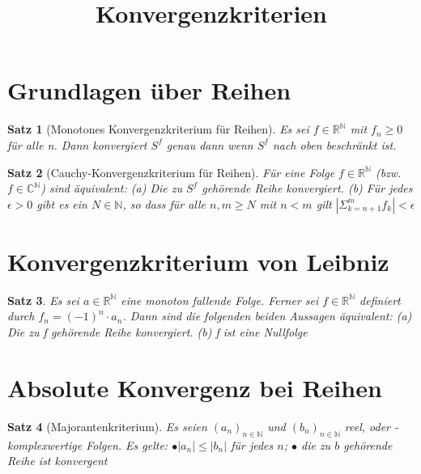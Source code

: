 \usepackage[utf8]{inputenc}
\usepackage{amssymb}
\usepackage{mathtools}
 
\title{Konvergenzkriterien}
\newtheorem{theorem}{Satz}[section]



\section{Grundlagen über Reihen}
\begin{theorem}[Monotones Konvergenzkriterium für Reihen]	

Es sei $f \in \mathbb{R}^{\mathbb{N}}$ mit $f_{n} \geq 0$ für alle n. Dann konvergiert $S^{f}$ genau dann wenn $S^{f}$ nach oben beschränkt ist.

\end{theorem}

\begin{theorem}[Cauchy-Konvergenzkriterium für Reihen]

Für eine Folge $f \in \mathbb{R}^{\mathbb{N}}$ (bzw. $f \in \mathbb{C}^{\mathbb{N}}$) sind äquivalent:
\newline
(a) Die zu  $S^{f}$ gehörende Reihe konvergiert.
\newline
(b) Für jedes $\epsilon > 0$ gibt es ein $N \in \mathbb{N}$, so dass für alle $n, m \geq N$ mit $n < m$ gilt $|\Sigma^{m}_{k = n+1} f_{k}| <  \epsilon$  
 
\end{theorem}

\section{Konvergenzkriterium von Leibniz}
\begin{theorem}
Es sei $a \in \mathbb{R}^{\mathbb{N}}$ eine monoton fallende Folge. Ferner sei
$f \in \mathbb{R}^{\mathbb{N}}$ definiert durch $f_n = (-1)^n\cdot a_n$. Dann sind die folgenden beiden Aussagen äquivalent:
\newline
(a) Die zu f gehörende Reihe konvergiert.
\newline
(b) f ist eine Nullfolge
\end{theorem}

\section{Absolute Konvergenz bei Reihen}
 \begin{theorem}[Majorantenkriterium]
 
 Es seien $(a_n)_{n \in \mathbb{N}}$ und $(b_n)_{n \in \mathbb{N}}$ reel, oder -komplexwertige Folgen. Es gelte:
\newline
$\bullet |a_n| \leq |b_n|$ für jedes $n$;
\newline
$\bullet$ die zu $b$ gehörende Reihe ist konvergent
 
\end{theorem}
 
